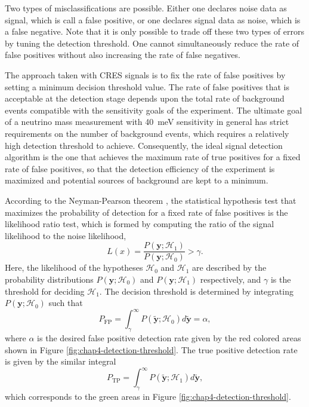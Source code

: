 Two types of misclassifications are possible. Either one declares noise data as signal, which is call a false positive, or one declares signal data as noise, which is a false negative. Note that it is only possible to trade off these two types of errors by tuning the detection threshold. One cannot simultaneously reduce the rate of false positives without also increasing the rate of false negatives.

The approach taken with CRES signals is to fix the rate of false positives by setting a minimum decision threshold value. The rate of false positives that is acceptable at the detection stage depends upon the total rate of background events compatible with the sensitivity goals of the experiment. The ultimate goal of a neutrino mass measurement with 40~meV sensitivity in general has strict requirements on the number of background events, which requires a relatively high detection threshold to achieve. Consequently, the ideal signal detection algorithm is the one that achieves the maximum rate of true positives for a fixed rate of false positives, so that the detection efficiency of the experiment is maximized and potential sources of background are kept to a minimum.

According to the Neyman-Pearson theorem \cite{neyman_pearson_lemma}, the statistical hypothesis test that maximizes the probability of detection for a fixed rate of false positives is the likelihood ratio test, which is formed by computing the ratio of the signal likelihood to the noise likelihood,
\begin{equation}
    L(x)=\frac{P(\bm{y};\mathcal{H}_1)}{P(\bm{y};\mathcal{H}_0)}>\gamma.
\end{equation}
Here, the likelihood of the hypotheses $\mathcal{H}_0$ and $\mathcal{H}_1$ are described by the probability distributions $P(\bm{y};\mathcal{H}_0)$ and $P(\bm{y};\mathcal{H}_1)$ respectively, and $\gamma$ is the threshold for deciding $\mathcal{H}_1$. The decision threshold is determined by integrating $P(\bm{y};\mathcal{H}_0)$ such that 
\begin{equation}
    P_{\textrm{FP}}=\int_\gamma^\infty{P(\tilde{\bm{y}};\mathcal{H}_0)d\tilde{\bm{y}}}=\alpha,
\end{equation}
where $\alpha$ is the desired false positive detection rate given by the red colored areas shown in Figure \ref{fig:chap4-detection-threshold}. The true positive detection rate is given by the similar integral 
\begin{equation}
    P_{\textrm{TP}}=\int_\gamma^\infty{P(\tilde{\bm{y}};\mathcal{H}_1)d\tilde{\bm{y}}},
\end{equation}
which corresponds to the green areas in Figure \ref{fig:chap4-detection-threshold}.

